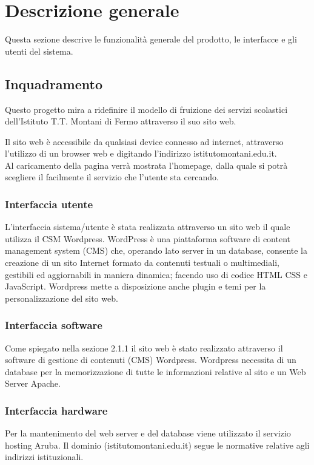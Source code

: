 \documentclass{article}
\begin{document}
	\vspace{1cm}
	
	\section{\textbf{Descrizione generale}}
     Questa sezione descrive le funzionalità generale del prodotto, le interfacce e gli utenti del sistema.

	\subsection{\textbf{Inquadramento}}
	Questo progetto mira a ridefinire il modello di fruizione dei servizi scolastici dell'Istituto T.T. Montani di Fermo attraverso il suo sito web.
	
	Il sito web è accessibile da qualsiasi device connesso ad internet, attraverso l'utilizzo di un browser web e digitando l'indirizzo istitutomontani.edu.it.\\
	Al caricamento della pagina verrà mostrata l'homepage, dalla quale si potrà scegliere il facilmente il servizio che l'utente sta cercando. 
	
	\subsubsection{\textbf{Interfaccia utente}}
	L’interfaccia sistema/utente è stata realizzata attraverso un sito web il quale utilizza il CSM Wordpress. WordPress è una piattaforma software di content management system (CMS) che, operando lato server in un database, consente la creazione di un sito Internet formato da contenuti testuali o multimediali, gestibili ed aggiornabili in maniera dinamica; facendo uso di codice HTML CSS e JavaScript. Wordpress mette a disposizione anche plugin e temi per la personalizzazione del sito web. 
	
	\subsubsection{\textbf{Interfaccia software}}
	Come spiegato nella sezione 2.1.1 il sito web è stato realizzato attraverso il software di gestione di contenuti (CMS) Wordpress. Wordpress necessita di un database per la memorizzazione di tutte le informazioni relative al sito e un Web Server Apache.  
	
	\subsubsection{\textbf{Interfaccia hardware}}
	Per la mantenimento del web server e del database viene utilizzato il servizio hosting Aruba. Il dominio (istitutomontani.edu.it) segue le normative relative agli indirizzi istituzionali.
	
\end{document}
